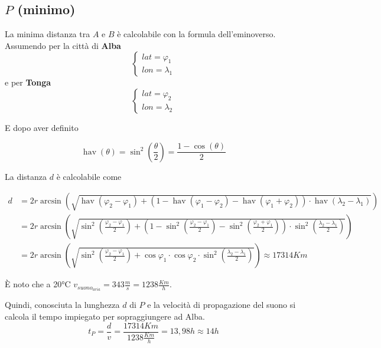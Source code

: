 \documentclass[12pt, a4paper]{article}
\begin{document}
\subsection{$P$ (minimo)}
La minima distanza tra $A$ e $B$ è calcolabile con la formula dell'eminoverso.\\
Assumendo per la città di \textbf{Alba} \begin{equation*}\begin{cases}lat=\varphi_1\\lon=\lambda_1\end{cases}\end{equation*}
e per \textbf{Tonga} \begin{equation*}\begin{cases}lat=\varphi_2\\lon=\lambda_2\end{cases}\end{equation*}

E dopo aver definito

$$
{\displaystyle \operatorname {hav} (\theta )=\sin ^{2}\left({\frac {\theta }{2}}\right)={\frac {1-\cos(\theta )}{2}}}
$$

La distanza $d$ è calcolabile come

$$
{\displaystyle {\begin{aligned}d&=2r\arcsin \left({\sqrt {\operatorname {hav} (\varphi _{2}-\varphi _{1})+(1-\operatorname {hav} (\varphi _{1}-\varphi _{2})-\operatorname {hav} (\varphi _{1}+\varphi _{2}))\cdot \operatorname {hav} (\lambda _{2}-\lambda _{1})}}\right)\\&=2r\arcsin \left({\sqrt {\sin ^{2}\left({\frac {\varphi _{2}-\varphi _{1}}{2}}\right)+\left(1-\sin ^{2}\left({\frac {\varphi _{2}-\varphi _{1}}{2}}\right)-\sin ^{2}\left({\frac {\varphi _{2}+\varphi _{1}}{2}}\right)\right)\cdot \sin ^{2}\left({\frac {\lambda _{2}-\lambda _{1}}{2}}\right)}}\right)\\&=2r\arcsin \left({\sqrt {\sin ^{2}\left({\frac {\varphi _{2}-\varphi _{1}}{2}}\right)+\cos \varphi _{1}\cdot \cos \varphi _{2}\cdot \sin ^{2}\left({\frac {\lambda _{2}-\lambda _{1}}{2}}\right)}}\right)\approx \boxed{17314 Km}\end{aligned}}}
$$

È noto che a 20°C $v_{suono_{aria}}=343\frac{m}{s}=1238\frac{Km}{h}$.

Quindi, conosciuta la lunghezza $d$ di $P$ e la velocità di propagazione del suono si calcola il tempo impiegato per sopraggiungere ad Alba.
$$
t_P=\frac{d}{v}=\frac{17314Km}{1238\frac{Km}{h}}=13,98h\approx14h
$$
\end{document}
